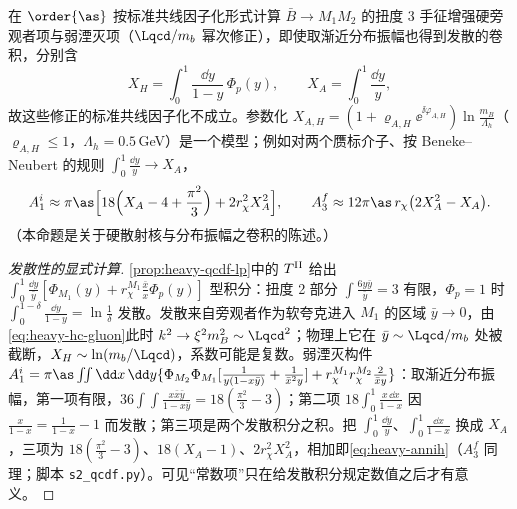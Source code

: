 \begin{proposition}\label{prop:heavy-qcdf-endpoint}
在 $\order{\as}$ 按标准共线因子化形式计算 $\bar B\to M_1M_2$ 的扭度 3 手征增强硬旁观者项与弱湮灭项（$\Lqcd/m_b$ 幂次修正），即使取渐近分布振幅也得到发散的卷积，分别含
\begin{equation}\label{eq:heavy-XAXH}
X_H=\int_0^1\frac{\dd y}{1-y}\,\Phi_p(y),\qquad X_A=\int_0^1\frac{\dd y}{y},
\end{equation}
故这些修正的标准共线因子化不成立。参数化 $X_{A,H}=(1+\varrho_{A,H}\ee^{\ii\varphi_{A,H}})\ln\frac{m_B}{\Lambda_h}$（$\varrho_{A,H}\le1$，$\Lambda_h=0.5$\,GeV）是一个模型；例如对两个赝标介子、按 Beneke--Neubert 的规则 $\int_0^1\frac{\dd y}{y}\to X_A$，
\begin{equation}\label{eq:heavy-annih}
A_1^i\approx\pi\as\Big[18\Big(X_A-4+\frac{\pi^2}{3}\Big)+2r_\chi^2X_A^2\Big],\qquad A_3^f\approx12\pi\as\,r_\chi\big(2X_A^2-X_A\big).
\end{equation}
（本命题是关于硬散射核与分布振幅之卷积的陈述。）
\end{proposition}

\begin{proof}[发散性的显式计算]
\cref{prop:heavy-qcdf-lp}中的 $T^{\rm II}$ 给出 $\int_0^1\frac{\dd y}{\bar y}[\Phi_{M_1}(y)+r_\chi^{M_1}\frac{\bar x}{x}\Phi_p(y)]$ 型积分\cite[式~(57)]{BenekeEtAl2001}：扭度 2 部分 $\int\frac{6y\bar y}{\bar y}=3$ 有限，$\Phi_p=1$ 时 $\int_0^{1-\delta}\frac{\dd y}{1-y}=\ln\frac1\delta$ 发散。发散来自旁观者作为软夸克进入 $M_1$ 的区域 $\bar y\to0$，由\cref{eq:heavy-hc-gluon}此时 $k^2\to\xi^2m_B^2\sim\Lqcd^2$；物理上它在 $\bar y\sim\Lqcd/m_b$ 处被截断，$X_H\sim\ln(m_b/\Lqcd)$，系数可能是复数\cite{BenekeEtAl2001}。弱湮灭构件 $A_1^i=\pi\as\int\!\!\int\dd x\,\dd y\{\Phi_{M_2}\Phi_{M_1}[\frac{1}{y(1-x\bar y)}+\frac{1}{\bar x^2y}]+r_\chi^{M_1}r_\chi^{M_2}\frac{2}{\bar xy}\}$\cite[式~(62)]{BenekeEtAl2001}：取渐近分布振幅，第一项有限，$36\int\!\!\int\frac{x\bar x\bar y}{1-x\bar y}=18(\frac{\pi^2}{3}-3)$；第二项 $18\int_0^1\frac{x\,\dd x}{1-x}$ 因 $\frac{x}{1-x}=\frac1{1-x}-1$ 而发散；第三项是两个发散积分之积。把 $\int_0^1\frac{\dd y}{y}$、$\int_0^1\frac{\dd x}{1-x}$ 换成 $X_A$，三项为 $18(\frac{\pi^2}{3}-3)$、$18(X_A-1)$、$2r_\chi^2X_A^2$，相加即\cref{eq:heavy-annih}（$A_3^f$ 同理；脚本 \texttt{s2\_\allowbreak qcdf.py}）。可见“常数项”只在给发散积分规定数值之后才有意义。
\end{proof}

